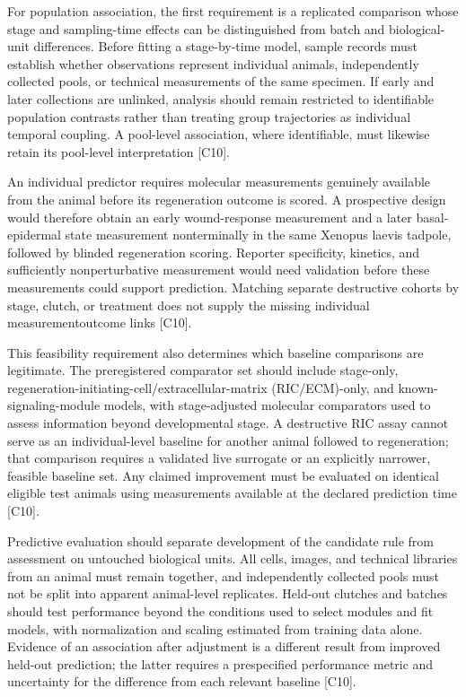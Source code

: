 \documentclass[11pt]{article}
\begin{document}
For population association, the first requirement is a replicated comparison whose stage and sampling-time effects can be distinguished from batch and biological-unit differences. Before fitting a stage-by-time model, sample records must establish whether observations represent individual animals, independently collected pools, or technical measurements of the same specimen. If early and later collections are unlinked, analysis should remain restricted to identifiable population contrasts rather than treating group trajectories as individual temporal coupling. A pool-level association, where identifiable, must likewise retain its pool-level interpretation [C10].

An individual predictor requires molecular measurements genuinely available from the animal before its regeneration outcome is scored. A prospective design would therefore obtain an early wound-response measurement and a later basal-epidermal state measurement nonterminally in the same Xenopus laevis tadpole, followed by blinded regeneration scoring. Reporter specificity, kinetics, and sufficiently nonperturbative measurement would need validation before these measurements could support prediction. Matching separate destructive cohorts by stage, clutch, or treatment does not supply the missing individual measurement\textendash{}outcome links [C10].

This feasibility requirement also determines which baseline comparisons are legitimate. The preregistered comparator set should include stage-only, regeneration-initiating-cell/extracellular-matrix (RIC/ECM)-only, and known-signaling-module models, with stage-adjusted molecular comparators used to assess information beyond developmental stage. A destructive RIC assay cannot serve as an individual-level baseline for another animal followed to regeneration; that comparison requires a validated live surrogate or an explicitly narrower, feasible baseline set. Any claimed improvement must be evaluated on identical eligible test animals using measurements available at the declared prediction time [C10].

Predictive evaluation should separate development of the candidate rule from assessment on untouched biological units. All cells, images, and technical libraries from an animal must remain together, and independently collected pools must not be split into apparent animal-level replicates. Held-out clutches and batches should test performance beyond the conditions used to select modules and fit models, with normalization and scaling estimated from training data alone. Evidence of an association after adjustment is a different result from improved held-out prediction; the latter requires a prespecified performance metric and uncertainty for the difference from each relevant baseline [C10].
\end{document}
